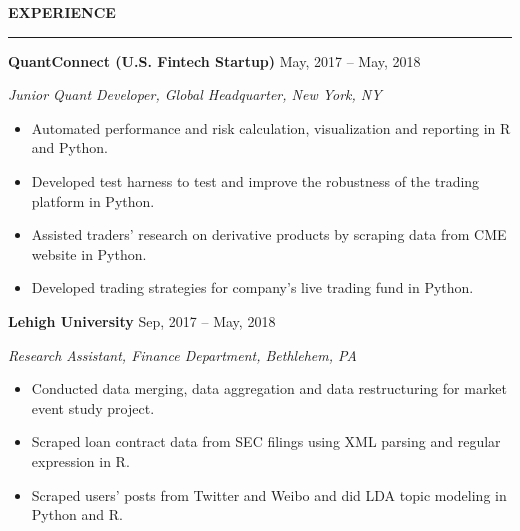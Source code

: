 \documentclass[a4paper,12pt]{report}
\newcommand{\marginAdj}{0.5in}
\begin{document}
\noindent 
\textbf{EXPERIENCE} \par
\vspace{2pt}
\hrule
\vspace{6pt}


\noindent 
\textbf{QuantConnect (U.S. Fintech Startup)}{\fontsize{9pt}{9pt}\selectfont  \hspace*{2.5in} \hspace*{\marginAdj}  {\fontsize{12pt}{12pt}\selectfont May, 2017 – May, 2018}} \par
\noindent 
{\fontsize{12pt}{12pt}\selectfont \textit{Junior Quant Developer, Global Headquarter, New York}\textit{, NY}} \par
\noindent 
\begin{itemize}[noitemsep,topsep=0pt]
	\item {\fontsize{12pt}{12pt}\selectfont Automated performance and risk calculation, visualization and reporting in R and Python.} \par
	\noindent 
	\item {\fontsize{12pt}{12pt}\selectfont Developed test harness to test and improve the robustness of the trading platform in Python.} \par
	\noindent 
	\item {\fontsize{12pt}{12pt}\selectfont Assisted traders' research on derivative products by scraping data from CME website in Python. } \par
	\noindent 
	\item {\fontsize{12pt}{12pt}\selectfont Developed trading strategies for company’s live trading fund in Python.} \par
	\noindent 
\end{itemize}


\noindent 
\textbf{Lehigh University}{\fontsize{9pt}{9pt}\selectfont  \hspace*{3.95in} \hspace*{\marginAdj} {\fontsize{12pt}{12pt}\selectfont Sep, 2017 – May, 2018}} \par
\noindent 
{\fontsize{12pt}{12pt}\selectfont \textit{Research Assistant, Finance Department, Bethlehem, PA}} \par
\noindent 
\begin{itemize}[noitemsep,topsep=0pt]
	\item {\fontsize{12pt}{12pt}\selectfont Conducted data merging, data aggregation and data restructuring for market event study project.} \par
	\noindent 
	\item {\fontsize{12pt}{12pt}\selectfont Scraped loan contract data from SEC filings using XML parsing and regular expression in R.} \par
	\noindent 
	\item {\fontsize{12pt}{12pt}\selectfont Scraped users' posts from Twitter and Weibo and did LDA topic modeling in Python and R.} \par
\end{itemize}
\end{document}
